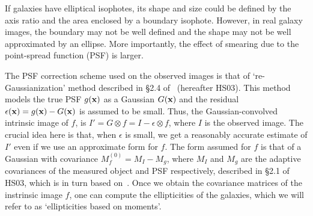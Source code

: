 \documentclass[twocolumn,useAMS,usenatbib]{mn2e}
\newcommand{\rachel}[1]{}
\newcommand{\arun}[1]{}
\newcommand{\rmd}{\mathrm{d}}
\begin{document}
If galaxies have elliptical isophotes, its shape and size could be defined by the axis ratio and the area enclosed by a boundary isophote. However, in real galaxy images,
the boundary may not be well defined and the shape may not be well approximated by an ellipse. More importantly, the effect of smearing due to the point-spread function (PSF) is larger. 
% 
% 

The PSF correction scheme used on the observed images is that of `re-Gaussianization' method described in \S 2.4 of~\cite{HS03} (hereafter HS03).
This method models the true PSF $g({\bf x})$ as a Gaussian $G({\bf x})$ and the residual $\epsilon({\bf x}) = g({\bf x}) - G({\bf x})$ is assumed to be small. Thus, the Gaussian-convolved
intrinsic image of $f$, is $I' = G\otimes f = I - \epsilon \otimes f$, where $I$ is the observed image. The crucial idea here is that, when $\epsilon$ is small, we get a reasonably accurate
estimate of $I'$ even if we use an approximate form for $f$. The form assumed for $f$ is that of a Gaussian with covariance $M_f^{(0)} = M_I - M_g$, where $M_I$ and $M_g$ are the adaptive
covariances of the measured object and PSF respectively, described in \S 2.1 of HS03, which is in turn based on~\cite{BJ02}. Once we obtain the covariance matrices of the instrinsic image $f$, one can compute the ellipticities 
of the galaxies, which we will refer to as `ellipticities based on moments'.
\end{document}
